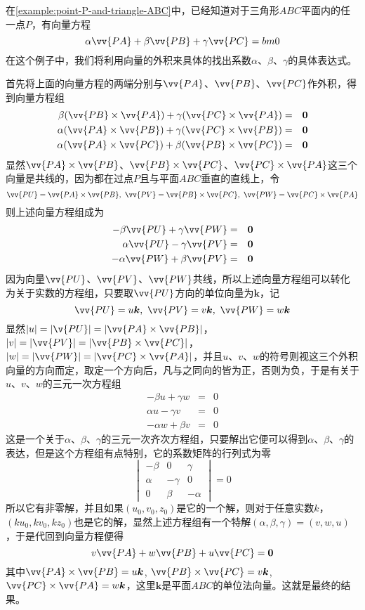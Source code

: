 \begin{example}
  在\autoref{example:point-P-and-triangle-ABC}中，已经知道对于三角形$ABC$平面内的任一点$P$，有向量方程
  \[ \alpha \vv{PA} + \beta \vv{PB} +\gamma \vv{PC} = bm{0} \]
  在这个例子中，我们将利用向量的外积来具体的找出系数$\alpha$、$\beta$、$\gamma$的具体表达式。

  首先将上面的向量方程的两端分别与$\vv{PA}$、$\vv{PB}$、$\vv{PC}$作外积，得到向量方程组
  \begin{eqnarray*}
    \beta (\vv{PB}\times\vv{PA}) + \gamma (\vv{PC}\times\vv{PA}) & = & \bm{0} \\
    \alpha (\vv{PA}\times\vv{PB}) + \gamma (\vv{PC}\times\vv{PB}) & = & \bm{0} \\
    \alpha (\vv{PA}\times\vv{PC}) + \beta (\vv{PB}\times\vv{PC}) & = & \bm{0}
  \end{eqnarray*}
  显然$\vv{PA}\times\vv{PB}$、$\vv{PB}\times\vv{PC}$、$\vv{PC}\times\vv{PA}$这三个向量是共线的，因为都在过点$P$且与平面$ABC$垂直的直线上，令
  \[ \vv{PU}=\vv{PA}\times\vv{PB}, \  \vv{PV}=\vv{PB}\times\vv{PC}, \  \vv{PW}=\vv{PC}\times\vv{PA} \]
  则上述向量方程组成为
  \begin{eqnarray*}
    -\beta \vv{PU} + \gamma \vv{PW} & = & \bm{0} \\
    \alpha \vv{PU} - \gamma \vv{PV} & = & \bm{0} \\
    - \alpha \vv{PW} + \beta \vv{PV} & = & \bm{0}
  \end{eqnarray*}
  因为向量$\vv{PU}$、$\vv{PV}$、$\vv{PW}$共线，所以上述向量方程组可以转化为关于实数的方程组，只要取$\vv{PU}$方向的单位向量为$\bm{k}$，记
  \[ \vv{PU}=u\bm{k}, \  \vv{PV} = v\bm{k}, \  \vv{PW}=w\bm{k} \]
  显然$|u|=|\v{PU}|=|\vv{PA}\times\vv{PB}|$，$|v|=|\vv{PV}|=|\vv{PB}\times\vv{PC}|$，$|w|=|\vv{PW}|=|\vv{PC}\times\vv{PA}|$，并且$u$、$v$、$w$的符号则视这三个外积向量的方向而定，取定一个方向后，凡与之同向的皆为正，否则为负，于是有关于$u$、$v$、$w$的三元一次方程组
  \begin{eqnarray*}
    -\beta u + \gamma w & = & 0 \\
    \alpha u - \gamma v & = & 0 \\
    - \alpha w + \beta v & = & 0
  \end{eqnarray*}
  这是一个关于$\alpha$、$\beta$、$\gamma$的三元一次齐次方程组，只要解出它便可以得到$\alpha$、$\beta$、$\gamma$的表达，但是这个方程组有点特别，它的系数矩阵的行列式为零
  \[
    \begin{vmatrix}
      -\beta & 0 & \gamma \\
      \alpha & -\gamma & 0 \\
      0 & \beta & -\alpha
    \end{vmatrix}
    = 0
  \]
  所以它有非零解，并且如果$(u_0,v_0,z_0)$是它的一个解，则对于任意实数$k$，$(ku_0,kv_0,kz_0)$也是它的解，显然上述方程组有一个特解$(\alpha,\beta,\gamma)=(v,w,u)$，于是代回到向量方程便得
  \[ v \vv{PA} + w \vv{PB} + u \vv{PC} = \bm{0} \]
  其中$\vv{PA}\times\vv{PB}=u\bm{k}$, $\vv{PB}\times\vv{PC}=v\bm{k}$, $\vv{PC}\times\vv{PA}=w\bm{k}$，这里$\bm{k}$是平面$ABC$的单位法向量。这就是最终的结果。


\end{example}
